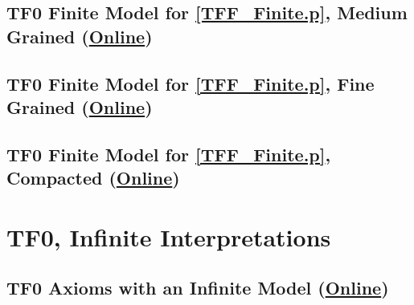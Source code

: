 \documentclass{easychair}
\begin{document}
\newpage
\subsection{TF0 Finite Model for \ref{TFF_Finite.p}, Medium Grained
(\href{https://raw.githubusercontent.com/GeoffsPapers/InterpretationFormat/master/Examples/TFF_Finite_Medium.s}{Online})}
\label{TFF_Finite_Medium.s}
\begin{small}

\end{small}

\newpage
\subsection{TF0 Finite Model for \ref{TFF_Finite.p}, Fine Grained
(\href{https://raw.githubusercontent.com/GeoffsPapers/InterpretationFormat/master/Examples/TFF_Finite_Fine.s}{Online})}
\label{TFF_Finite_Fine.s}
\begin{small}

\end{small}

\newpage
\subsection{TF0 Finite Model for \ref{TFF_Finite.p}, Compacted
(\href{https://raw.githubusercontent.com/GeoffsPapers/InterpretationFormat/master/Examples/TFF_Finite_Compact.s}{Online})}
\label{TFF_Finite_Compact.s}
\begin{small}

\end{small}

\newpage
\section{TF0, Infinite Interpretations}
\label{TF0Infinite}

\subsection{TF0 Axioms with an Infinite Model
(\href{https://raw.githubusercontent.com/GeoffsPapers/InterpretationFormat/master/Examples/TFF_Infinite.p}{Online})}
\label{TFF_Infinite.p}
\begin{small}

\end{small}
\end{document}
